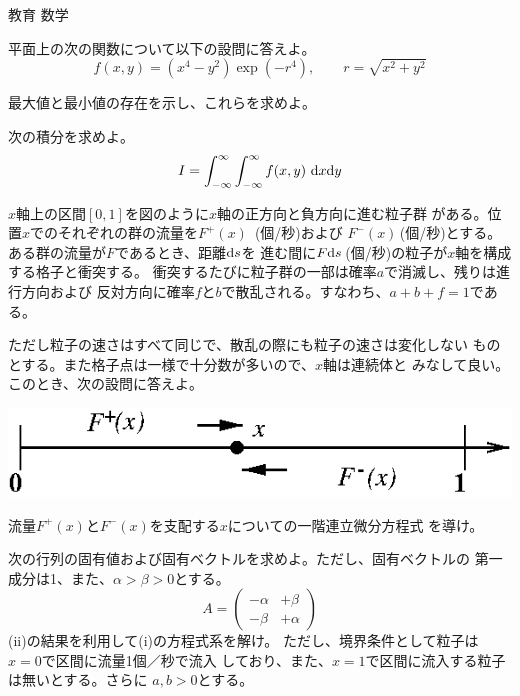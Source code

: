 \documentclass[fleqn]{jbook}
\begin{document}
\begin{question}{教育 数学}{}

\begin{subquestions}
\SubQuestion

平面上の次の関数について以下の設問に答えよ。
\[f(x,y)=(x^4-y^2)\exp(-r^4),\qquad r=\sqrt{x^2+y^2} \]

  \begin{subsubquestions}
  \SubSubQuestion
    最大値と最小値の存在を示し、これらを求めよ。

  \SubSubQuestion
    次の積分を求めよ。
%
    \[ I=\int_{-\infty}^{\infty}\int_{-\infty}^{\infty}f(x,y)\,\,{\rm d}x{\rm d}y \]
%

  \end{subsubquestions}



\SubQuestion
  $x$軸上の区間$[0,1]$を図のように$x$軸の正方向と負方向に進む粒子群
  がある。位置$x$でのそれぞれの群の流量を$F^+(x)$\, (個/秒)および
  $F^-(x)$\,(個/秒)とする。ある群の流量が$F$であるとき、距離${\rm d}s$を
  進む間に$F{\rm d}s$\,(個/秒)の粒子が$x$軸を構成する格子と衝突する。
  衝突するたびに粒子群の一部は確率$a$で消滅し、残りは進行方向および
  反対方向に確率$f$と$b$で散乱される。すなわち、$a+b+f=1$である。\\
%
  \parbox[t]{85mm}{
  ただし粒子の速さはすべて同じで、散乱の際にも粒子の速さは変化しない
  ものとする。また格子点は一様で十分数が多いので、$x$軸は連続体と
  みなして良い。このとき、次の設問に答えよ。
  }\parbox[t]{75mm}{
  \begin{center}
    \mbox{\includegraphics[clip]{1993math-1.eps}}
  \end{center}}

  \begin{subsubquestions}
  \SubSubQuestion
    流量$F^+(x)$と$F^-(x)$を支配する$x$についての一階連立微分方程式
    を導け。

  \SubSubQuestion
    次の行列の固有値および固有ベクトルを求めよ。ただし、固有ベクトルの
    第一成分は1、また、$\alpha>\beta>0$とする。
%
    \[ A = \begin{pmatrix}%
              -\alpha & +\beta \\
              -\beta  & +\alpha \end{pmatrix} \]
%
  \SubSubQuestion
    (ii)の結果を利用して(i)の方程式系を解け。
    ただし、境界条件として粒子は$x=0$で区間に流量1個／秒で流入
    しており、また、$x=1$で区間に流入する粒子は無いとする。さらに
    $a,b>0$とする。
  \end{subsubquestions}



\end{subquestions}
\end{question}
\end{document}
